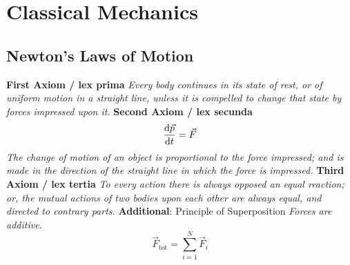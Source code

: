 \section{Classical Mechanics}
	\subsection{Newton's Laws of Motion}
		\textbf{First Axiom / lex prima} \newline%
			\indent \textit{Every body continues in its state of rest, or of uniform motion in a straight line, unless it is compelled to change that state by forces impressed upon it.} \nl%
		\textbf{Second Axiom / lex secunda}%
			\begin{equation}
				\frac{\dd \vec{p}}{\dd t} = \vec{F}
			\end{equation}
			\indent \textit{The change of motion of an object is proportional to the force impressed; and is made in the direction of the straight line in which the force is impressed.}\nl%
		\textbf{Third Axiom / lex tertia} \newline %
			\indent \textit{To every action there is always opposed an equal reaction; or, the mutual actions of two bodies upon each other are always equal, and directed to contrary parts.} \nl%
		\textbf{Additional}: Principle of Superposition \newline%
			\indent \textit{Forces are additive.}%
			\begin{equation}
				\vec{F}_{\mathrm{tot}} = \sum_{i=1}^{N} \vec{F}_i
			\end{equation}

